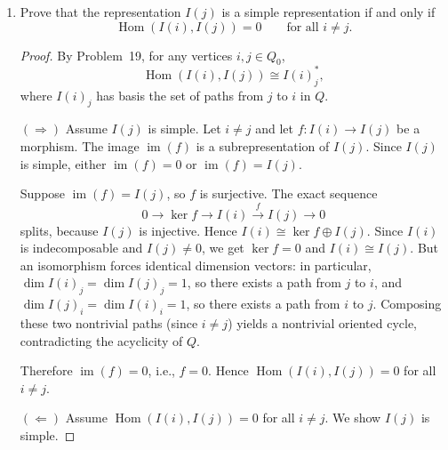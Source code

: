 \documentclass[11pt, a4paper]{article}
\begin{document}
\begin{enumerate}[leftmargin=*, label=\textbf{\arabic*.}]
\begin{proof}
    \medskip
    Since the paths $p$ from $j$ to $i$ form a basis of $I(i)_j$, the dual functionals $\{p^*\}$ form a basis of $I(i)_j^*$, and thus the morphisms $\{\theta^p\}$ form a basis of $\operatorname{Hom}(I(i),I(j))$.
    
    \medskip\noindent\textbf{The special case $i=j$.}
    The only path from $i$ to $i$ is the trivial path $e_i$ (since $Q$ has no oriented cycles). Therefore
    \[
    \operatorname{End}(I(i))=\operatorname{Hom}(I(i),I(i))\cong k,
    \]
    with basis $\{\theta^{e_i}\}=\{\mathrm{id}_{I(i)}\}$.
\end{proof}

\item Prove that the representation $I(j)$ is a simple representation if and only if
\[
\operatorname{Hom}(I(i),I(j))=0
\qquad \text{for all } i\neq j.
\]

\begin{proof}
    By Problem~19, for any vertices $i,j\in Q_0$,
    \[
    \operatorname{Hom}(I(i),I(j))\cong I(i)_j^*,
    \]
    where $I(i)_j$ has basis the set of paths from $j$ to $i$ in $Q$.
    
    \medskip\noindent$(\Rightarrow)$ Assume $I(j)$ is simple. Let $i\neq j$ and let $f\colon I(i)\to I(j)$ be a morphism. The image $\operatorname{im}(f)$ is a subrepresentation of $I(j)$. Since $I(j)$ is simple, either $\operatorname{im}(f)=0$ or $\operatorname{im}(f)=I(j)$.
    
    Suppose $\operatorname{im}(f)=I(j)$, so $f$ is surjective. The exact sequence
    \[
    0\to\ker f\to I(i)\xrightarrow{f} I(j)\to 0
    \]
    splits, because $I(j)$ is injective. Hence $I(i)\cong\ker f\oplus I(j)$. Since $I(i)$ is indecomposable and $I(j)\neq 0$, we get $\ker f=0$ and $I(i)\cong I(j)$. But an isomorphism forces identical dimension vectors: in particular, $\dim I(i)_j=\dim I(j)_j=1$, so there exists a path from $j$ to $i$, and $\dim I(j)_i=\dim I(i)_i=1$, so there exists a path from $i$ to $j$. Composing these two nontrivial paths (since $i\neq j$) yields a nontrivial oriented cycle, contradicting the acyclicity of $Q$.
    
    Therefore $\operatorname{im}(f)=0$, i.e., $f=0$. Hence $\operatorname{Hom}(I(i),I(j))=0$ for all $i\neq j$.
    
    \medskip\noindent$(\Leftarrow)$ Assume $\operatorname{Hom}(I(i),I(j))=0$ for all $i\neq j$. We show $I(j)$ is simple.
    

\end{proof}
\end{enumerate}
\end{document}
